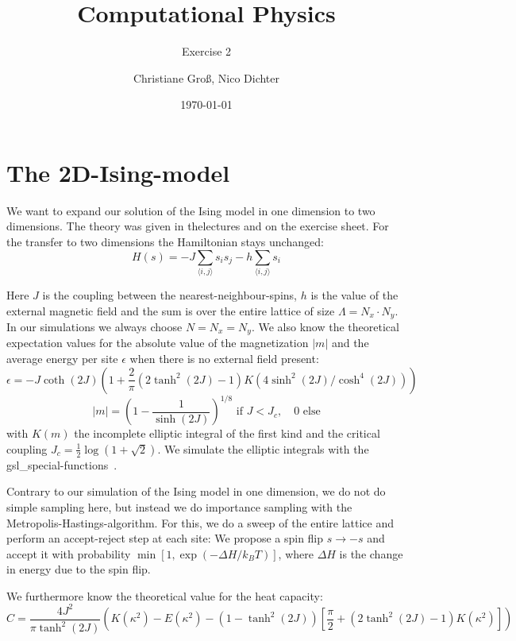 \documentclass{scrartcl}
\title{Computational Physics}
\subtitle{Exercise 2}
\date{\today}
\author{Christiane Groß, Nico Dichter}
\begin{document}
	\maketitle
\section{The 2D-Ising-model}
We want to expand our solution of the Ising model in one dimension to two dimensions. The theory was given in thelectures and on the exercise sheet. For the transfer to two dimensions the Hamiltonian stays unchanged: 
\begin{equation}
H(s)=-J\sum_{\langle i,j\rangle }s_is_j-h\sum_{\langle i,j\rangle }s_i
\label{eq:hamiltonianising}
\end{equation}

Here $J$ is the coupling between the nearest-neighbour-spins, $h$ is the value of the external magnetic field and the sum is over the entire lattice of size $\Lambda=N_x \cdot N_y$. In our simulations we always choose $N=N_x=N_y$.
We also know the theoretical expectation values for the  absolute value of the magnetization $|m|$ and the average energy per site $\epsilon$ when there is no external field present:
\begin{equation}
\epsilon=-J\coth(2J)\left( 1+\frac{2}{\pi}(2\tanh^2(2J)-1)K(4\sinh^2(2J)/\cosh^4(2J))\right) 
\end{equation}
\begin{equation}
|m|=\left( 1-\frac{1}{\sinh(2J)}\right)^{1/8} \text{ if } J<J_c,\quad 0 \text{ else}   
\end{equation}
 with $K(m)$ the incomplete elliptic integral of the first kind and the critical coupling $J_c=\frac{1}{2}\log(1+\sqrt{2})$. We simulate the elliptic integrals with the gsl\_special-functions~\cite{gsldoc_sf}.
 
 Contrary to our simulation of the Ising model in one dimension, we do not do simple sampling here, but instead we do importance sampling with the Metropolis-Hastings-algorithm. For this, we do a sweep of the entire lattice and perform an accept-reject step at each site: We propose a spin flip $s\rightarrow-s$ and accept it with probability $\min \left[1, \exp(-\Delta H/k_BT)\right]$, where $\Delta H$ is the change in energy due to the spin flip.  

We furthermore know the theoretical value for the heat capacity:
\begin{equation}
C=\frac{4J^2}{\pi\tanh^2(2J)}\left( K(\kappa^2)-E(\kappa^2)-\left(1-\tanh^2(2J)\right)\left[\frac{\pi}{2} +\left(2\tanh^2(2J)-1\right)K(\kappa^2)\right] \right)
\end{equation}
\end{document}
